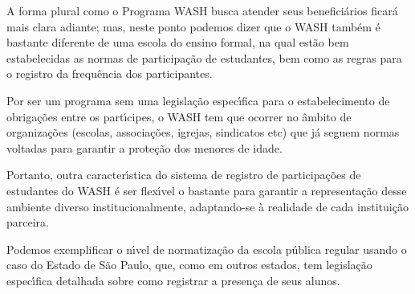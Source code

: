 \documentclass[
12pt,		%
openright,	%
twoside,  %
a4paper,			%
chapter=TITLE,		%
english,			%
french,				%
spanish,			%
brazil				%
]{USPSC-classe/USPSC}
\begin{document}
A forma plural como o Programa WASH busca atender seus benefici\'arios ficar\'a mais clara adiante; mas, neste ponto podemos dizer que o WASH tamb\'em \'e bastante diferente de uma escola do ensino formal, na qual est\~ao bem estabelecidas as normas de participa\c{c}\~ao de estudantes, bem como as regras para o registro da frequ\^encia dos participantes.

















Por ser um programa sem uma legisla\c{c}\~ao espec\'{\i}fica para o estabelecimento de obriga\c{c}\~oes entre os part\'{\i}cipes, o WASH tem que ocorrer no \^ambito de organiza\c{c}\~oes (escolas, associa\c{c}\~oes, igrejas, sindicatos etc) que j\'a seguem normas voltadas para garantir a prote\c{c}\~ao dos menores de idade.

















Portanto, outra caracter\'{\i}stica do sistema de registro de participa\c{c}\~oes de estudantes do WASH \'e ser flex\'{\i}vel o bastante para garantir a representa\c{c}\~ao desse ambiente diverso institucionalmente, adaptando-se \`a realidade de cada institui\c{c}\~ao parceira.

















Podemos exemplificar o n\'{\i}vel de normatiza\c{c}\~ao da escola p\'ublica regular usando o caso do Estado de S\~ao Paulo, que, como em outros estados, tem legisla\c{c}\~ao espec\'{\i}fica detalhada sobre como registrar a presen\c{c}a de seus alunos.
\end{document}
